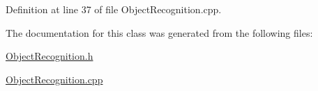 Definition at line 37 of file ObjectRecognition.cpp.



The documentation for this class was generated from the following files:\begin{DoxyCompactItemize}
\item 
\hyperlink{_object_recognition_8h}{ObjectRecognition.h}\item 
\hyperlink{_object_recognition_8cpp}{ObjectRecognition.cpp}\end{DoxyCompactItemize}
